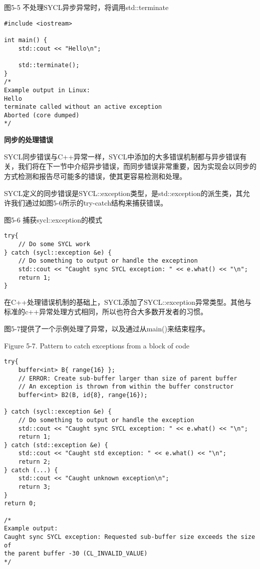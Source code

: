\hspace*{\fill} \par %
图5-5 不处理SYCL异步异常时，将调用std::terminate
\begin{lstlisting}[caption={}]
#include <iostream>

int main() {
	std::cout << "Hello\n";
	
	std::terminate();
}
/*
Example output in Linux:
Hello
terminate called without an active exception
Aborted (core dumped)
*/
\end{lstlisting}

\hspace*{\fill} \par %
\textbf{同步的处理错误}

SYCL同步错误与C++异常一样，SYCL中添加的大多错误机制都与异步错误有关，我们将在下一节中介绍异步错误，而同步错误非常重要，因为实现会以同步的方式检测和报告尽可能多的错误，使其更容易检测和处理。\par

SYCL定义的同步错误是SYCL::exception类型，是std::exception的派生类，其允许我们通过如图5-6所示的try-catch结构来捕获错误。\par

\hspace*{\fill} \par %
图5-6 捕获sycl::exception的模式
\begin{lstlisting}[caption={}]
try{
	// Do some SYCL work
} catch (sycl::exception &e) {
	// Do something to output or handle the exceptinon 
	std::cout << "Caught sync SYCL exception: " << e.what() << "\n";
	return 1;
} 
\end{lstlisting}

在C++处理错误机制的基础上，SYCL添加了SYCL::exception异常类型。其他与标准的c++异常处理方式相同，所以也符合大多数开发者的习惯。\par

图5-7提供了一个示例处理了异常，以及通过从main()来结束程序。\par

\hspace*{\fill} \par %
Figure 5-7. Pattern to catch exceptions from a block of code
\begin{lstlisting}[caption={}]
try{
	buffer<int> B{ range{16} };
	// ERROR: Create sub-buffer larger than size of parent buffer
	// An exception is thrown from within the buffer constructor
	buffer<int> B2(B, id{8}, range{16});
	
} catch (sycl::exception &e) {
	// Do something to output or handle the exception 
	std::cout << "Caught sync SYCL exception: " << e.what() << "\n";
	return 1;
} catch (std::exception &e) {
	std::cout << "Caught std exception: " << e.what() << "\n";
	return 2;
} catch (...) {
	std::cout << "Caught unknown exception\n";
	return 3;
}
return 0;

/*
Example output:
Caught sync SYCL exception: Requested sub-buffer size exceeds the size of 
the parent buffer -30 (CL_INVALID_VALUE)
*/
\end{lstlisting}

